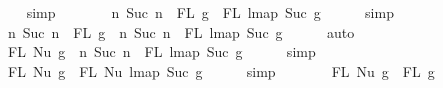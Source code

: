 \begin{isabellebody}
\ \ \ \ \isamarkupfalse%
\ simp\isanewline
\ \ \isamarkupfalse%
\ \isamarkupfalse%
\ {\isachardoublequoteopen}{\isachardot}{\kern0pt}{\isachardot}{\kern0pt}{\isachardot}{\kern0pt}\ {\isacharequal}{\kern0pt}\ {\isacharbraceleft}{\kern0pt}n{\isachardot}{\kern0pt}\ Suc\ n\ {\isasymin}\ {\isacharparenleft}{\kern0pt}FL\ g{}\ {\isasymunion}\ FL\ {\isacharparenleft}{\kern0pt}lmap\ Suc\ g{}{\isacharparenright}{\kern0pt}{\isacharparenright}{\kern0pt}{\isacharbraceright}{\kern0pt}{\isachardoublequoteclose}\isanewline
\ \ \ \ \isamarkupfalse%
\ simp\isanewline
\ \ \isamarkupfalse%
\ \isamarkupfalse%
\ {\isachardoublequoteopen}{\isachardot}{\kern0pt}{\isachardot}{\kern0pt}{\isachardot}{\kern0pt}\ {\isacharequal}{\kern0pt}\ {\isacharbraceleft}{\kern0pt}n{\isachardot}{\kern0pt}\ Suc\ n\ {\isasymin}\ FL\ g{}{\isacharbraceright}{\kern0pt}\ {\isasymunion}\ {\isacharbraceleft}{\kern0pt}n{\isachardot}{\kern0pt}\ Suc\ n\ {\isasymin}\ FL\ {\isacharparenleft}{\kern0pt}lmap\ Suc\ g{}{\isacharparenright}{\kern0pt}{\isacharbraceright}{\kern0pt}{\isachardoublequoteclose}\isanewline
\ \ \ \ \isamarkupfalse%
\ auto\isanewline
\ \ \isamarkupfalse%
\ \isamarkupfalse%
\ {\isachardoublequoteopen}{\isachardot}{\kern0pt}{\isachardot}{\kern0pt}{\isachardot}{\kern0pt}\ {\isacharequal}{\kern0pt}\ FL\ {\isacharparenleft}{\kern0pt}Nu\ g{}{\isacharparenright}{\kern0pt}\ {\isasymunion}\ {\isacharbraceleft}{\kern0pt}n{\isachardot}{\kern0pt}\ Suc\ n\ {\isasymin}\ FL\ {\isacharparenleft}{\kern0pt}lmap\ Suc\ g{}{\isacharparenright}{\kern0pt}{\isacharbraceright}{\kern0pt}{\isachardoublequoteclose}\isanewline
\ \ \ \ \isamarkupfalse%
\ simp\isanewline
\ \ \isamarkupfalse%
\ \isamarkupfalse%
\ {\isachardoublequoteopen}{\isachardot}{\kern0pt}{\isachardot}{\kern0pt}{\isachardot}{\kern0pt}\ {\isacharequal}{\kern0pt}\ FL\ {\isacharparenleft}{\kern0pt}Nu\ g{}{\isacharparenright}{\kern0pt}\ {\isasymunion}\ FL\ {\isacharparenleft}{\kern0pt}Nu\ {\isacharparenleft}{\kern0pt}lmap\ Suc\ g{}{\isacharparenright}{\kern0pt}{\isacharparenright}{\kern0pt}{\isachardoublequoteclose}\isanewline
\ \ \ \ \isamarkupfalse%
\ simp\isanewline
\ \ \isamarkupfalse%
\ \isamarkupfalse%
\ {\isachardoublequoteopen}{\isachardot}{\kern0pt}{\isachardot}{\kern0pt}{\isachardot}{\kern0pt}\ {\isacharequal}{\kern0pt}\ FL\ {\isacharparenleft}{\kern0pt}Nu\ g{}{\isacharparenright}{\kern0pt}\ {\isasymunion}\ FL\ g{}{\isachardoublequoteclose}\isanewline

\end{isabellebody}
